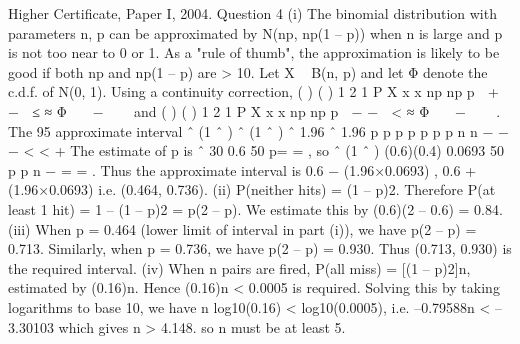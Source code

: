 Higher Certificate, Paper I, 2004. Question 4
(i) The binomial distribution with parameters n, p can be approximated by
N(np, np(1 – p)) when n is large and p is not too near to 0 or 1. As a "rule of thumb",
the approximation is likely to be good if both np and np(1 – p) are > 10.
Let X ~ B(n, p) and let Φ denote the c.d.f. of N(0, 1). Using a continuity correction,
( )
( )
1
2
1
P X x x np
np p
 + −  ≤ ≈ Φ 
 −   
and ( )
( )
1
2
1
P X x x np
np p
 − −  < ≈ Φ 
 −   
.
The 95%
approximate interval
ˆ (1 ˆ ) ˆ (1 ˆ )
ˆ 1.96 ˆ 1.96
p p p p
p p p
n n
− −
− < < +
The estimate of p is ˆ 30 0.6
50
p= = , so ˆ (1 ˆ ) (0.6)(0.4)
0.0693
50
p p
n
−
= = . Thus
the approximate interval is
0.6 − (1.96×0.0693) , 0.6 + (1.96×0.0693)
i.e. (0.464, 0.736).
(ii) P(neither hits) = (1 – p)2. Therefore P(at least 1 hit) = 1 – (1 – p)2 = p(2 – p).
We estimate this by (0.6)(2 – 0.6) = 0.84.
(iii) When p = 0.464 (lower limit of interval in part (i)), we have p(2 – p) = 0.713.
Similarly, when p = 0.736, we have p(2 – p) = 0.930. Thus (0.713, 0.930) is the
required interval.
(iv) When n pairs are fired, P(all miss) = [(1 – p)2]n, estimated by (0.16)n. Hence
(0.16)n < 0.0005 is required. Solving this by taking logarithms to base 10, we have
n log10(0.16) < log10(0.0005), i.e. –0.79588n < –3.30103 which gives n > 4.148. so n
must be at least 5.
